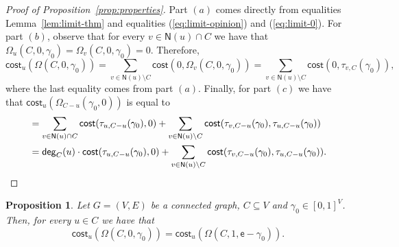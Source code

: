 \documentclass[letterpaper,11pt]{article}
\newcommand{\nsf}{\mathsf{N}}
\newcommand{\cost}{\mathsf{cost}}
\newcommand{\degsf}{\mathsf{deg}}
\newtheorem{proposition}{Proposition}
\begin{document}
\begin{proof}[Proof of Proposition~\ref{prop:properties}]
Part $(a)$ comes directly from equalities Lemma~\ref{lem:limit-thm} and equalities (\ref{eq:limit-opinion}) and (\ref{eq:limit-0}).
For part $(b)$, observe that for every $v\in \nsf(u)\cap C$ we have that 
$\Omega_u(C,0,\gamma_0)=\Omega_v(C,0,\gamma_0)=0$.
Therefore,
\begin{equation*}
\cost_u(\Omega(C,0,\gamma_0))=\sum_{v\in \nsf(u)\setminus C}\cost(0,\Omega_v(C,0,\gamma_0))=\sum_{v\in \nsf(u)\setminus C}\cost(0,\tau_{v,C}(\gamma_0)),
\end{equation*}
where the last equality comes from part $(a)$.
Finally, for part $(c)$ 
we have that $\cost_u(\Omega_{C-u}(\gamma_0,0))$ is equal to 
\begin{align*}
&=\sum_{v\in \nsf(u)\cap C}\cost(\tau_{u,C-u}(\gamma_0),0)+\sum_{v\in \nsf(u)\setminus C}\cost(\tau_{v,C-u}(\gamma_0),\tau_{u,C-u}(\gamma_0))\\
&=\degsf_C(u)\cdot \cost(\tau_{u,C-u}(\gamma_0),0)+\sum_{v\in \nsf(u)\setminus C}\cost(\tau_{v,C-u}(\gamma_0),\tau_{u,C-u}(\gamma_0)).\qedhere
\end{align*}
\end{proof}

\begin{proposition}
\label{prop:spin}
Let $G=(V,E)$ be a connected graph, $C\subseteq V$ and $\gamma_0\in [0,1]^V$.
Then, for every $u\in C$ we have that 
\begin{equation*}
\cost_u(\Omega(C,0,\gamma_0))=\cost_u(\Omega(C,1,\mathsf{e}-\gamma_0)).
\end{equation*}
\end{proposition}
\end{document}
